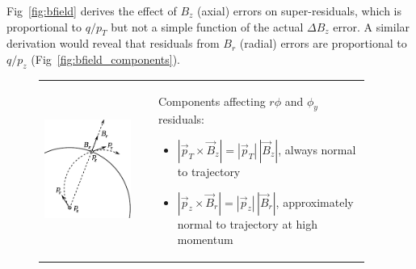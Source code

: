 \documentclass[12pt]{article}
\begin{document}
Fig~\ref{fig:bfield} derives the effect of $B_z$ (axial) errors on
super-residuals, which is proportional to $q/p_T$ but not a simple
function of the actual $\Delta B_z$ error.  A similar derivation would
reveal that residuals from $B_r$ (radial) errors are proportional to
$q/p_z$ (Fig~\ref{fig:bfield_components}).

\begin{figure}
\begin{center}
\begin{tabular}{p{0.3\linewidth} c p{0.65\linewidth}}
\includegraphics[width=\linewidth]{bfield_components.pdf} & \hspace{0.5 cm} &
\begin{minipage}{\linewidth}
\vspace{-4.5 cm}
\noindent Components affecting $r\phi$ and $\phi_y$ residuals:
\begin{itemize}
\item $|\vec{p}_T \times \vec{B}_z| = |\vec{p}_T| \, |\vec{B}_z|$, always normal to trajectory
\item $|\vec{p}_z \times \vec{B}_r| = |\vec{p}_z| \, |\vec{B}_r|$, approximately normal to trajectory at high momentum
\end{itemize}


\end{minipage}
\end{tabular}
\end{center}
\end{figure}
\end{document}
